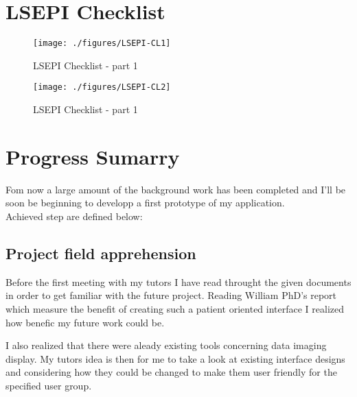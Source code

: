 \documentclass[12pt,twoside]{article}
\begin{document}
\clearpage
\section{LSEPI Checklist}

\begin{figure}[ht]
\centering
\texttt{[image: ./figures/LSEPI-CL1]}
\caption{LSEPI Checklist - part 1}
\end{figure}

\clearpage

\begin{figure}[tb]
\centering
\texttt{[image: ./figures/LSEPI-CL2]}
\caption{LSEPI Checklist - part 1}
\end{figure}


\clearpage
\section{Progress Sumarry}

Fom now a large amount of the background work has been completed and I'll be soon be beginning to developp a first prototype of my application. \\
Achieved step are defined below:

\subsection{Project field apprehension}
Before the first meeting with my tutors I have read throught the given documents in order to get familiar with the future project. Reading William PhD's report which measure the benefit of creating such a patient oriented interface I realized how benefic my future work could be.

I also realized that there were aleady existing tools concerning data imaging display. My tutors idea is then for me to take a look at existing interface designs and considering how they could be changed to make them user friendly for the specified user group.
\end{document}
